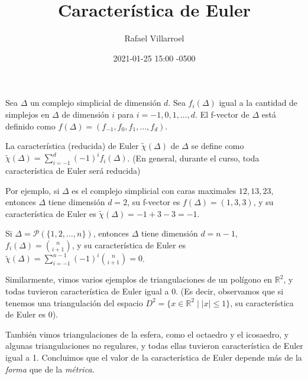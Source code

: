 \documentclass[spanish, presentation]{beamer}
\author{Rafael Villarroel}
\date{2021-01-25 15:00 -0500}
\title{Característica de Euler}
\begin{document}
\maketitle
{}

Sea \(\Delta\) un complejo simplicial de dimensión \(d\). Sea \(f_{i}(\Delta)\) igual a la cantidad de simplejos en \(\Delta\) de dimensión \(i\) para \(i=-1,0,1,\ldots,d\). El \alert{f-vector} de \(\Delta\) está definido como \(f(\Delta)=(f_{-1},f_{0},f_{1},\ldots,f_{d})\).

La \alert{característica (reducida) de Euler} \(\tilde{\chi}(\Delta)\) de \(\Delta\) se define como \(\tilde{\chi}(\Delta)=\sum_{i=-1}^{d}(-1)^{i}f_{i}(\Delta)\). (En general, durante el curso, toda característica de Euler será reducida)

Por ejemplo, si \(\Delta\) es el complejo simplicial con caras maximales \(12,13,23\), entonces \(\Delta\) tiene dimensión \(d=2\), su f-vector es \(f(\Delta)=(1,3,3)\), y su característica de Euler es \(\tilde{\chi}(\Delta)=-1+3-3=-1\).

Si \(\Delta=\mathcal{P}(\{1,2,\ldots,n\})\),  entonces \(\Delta\) tiene dimensión \(d=n-1\),  \(f_{i}(\Delta)=\binom{n}{i+1}\), y su característica de Euler es \(\tilde{\chi}(\Delta)=\sum_{i=-1}^{n-1}(-1)^{i}\binom{n}{i+1}=0\).

Similarmente, vimos varios ejemplos de triangulaciones de un polígono en \(\mathbb{R}^{2}\), y todas tuvieron característica de Euler igual a 0. (Es decir, observamos que si tenemos una triangulación del espacio \(D^{2}=\{x\in \mathbb{R}^{2}\mid |x|\leq 1\}\), su característica de Euler es 0).

También vimos triangulaciones de la esfera, como el octaedro y el icosaedro, y algunas triangulaciones no regulares, y todas ellas tuvieron característica de Euler igual a 1. Concluimos que el valor de la característica de Euler depende más de la \emph{forma}
 que de la \emph{métrica.}
\end{document}
